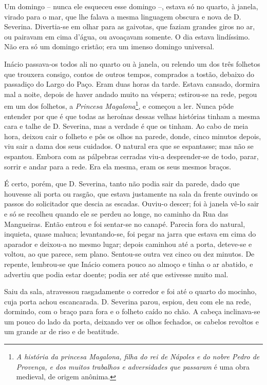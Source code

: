 Um domingo -- nunca ele esqueceu esse domingo --, estava só no quarto, à
janela, virado para o mar, que lhe falava a mesma linguagem obscura e
nova de D. Severina. Divertia-se em olhar para as gaivotas, que faziam
grandes giros no ar, ou pairavam em cima d'água, ou avoaçavam somente. O
dia estava lindíssimo. Não era só um domingo cristão; era um imenso
domingo universal.

Inácio passava-os todos ali no quarto ou à janela, ou relendo um dos
três folhetos que trouxera consigo, contos de outros tempos, comprados a
tostão, debaixo do passadiço do Largo do Paço. Eram duas horas da tarde.
Estava cansado, dormira mal a noite, depois de haver andado muito na
véspera; estirou-se na rede, pegou em um dos folhetos, a \emph{Princesa
Magalona}\footnote{\emph{A história da princesa Magalona, filha do rei
  de Nápoles e do nobre Pedro de Provença, e dos muitos trabalhos e
  adversidades que passaram} é uma obra medieval, de origem anônima.}, e
começou a ler. Nunca pôde entender por que é que todas as heroínas
dessas velhas histórias tinham a mesma cara e talhe de D. Severina, mas
a verdade é que os tinham. Ao cabo de meia hora, deixou cair o folheto e
pôs os olhos na parede, donde, cinco minutos depois, viu sair a dama dos
seus cuidados. O natural era que se espantasse; mas não se espantou.
Embora com as pálpebras cerradas viu-a desprender-se de todo, parar,
sorrir e andar para a rede. Era ela mesma, eram os seus mesmos braços.

É certo, porém, que D. Severina, tanto não podia sair da parede, dado
que houvesse ali porta ou rasgão, que estava justamente na sala da
frente ouvindo os passos do solicitador que descia as escadas. Ouviu-o
descer; foi à janela vê-lo sair e só se recolheu quando ele se perdeu ao
longe, no caminho da Rua das Mangueiras. Então entrou e foi sentar-se no
canapé. Parecia fora do natural, inquieta, quase maluca; levantando-se,
foi pegar na jarra que estava em cima do aparador e deixou-a no mesmo
lugar; depois caminhou até a porta, deteve-se e voltou, ao que parece,
sem plano. Sentou-se outra vez cinco ou dez minutos. De repente,
lembrou-se que Inácio comera pouco ao almoço e tinha o ar abatido, e
advertiu que podia estar doente; podia ser até que estivesse muito mal.

Saiu da sala, atravessou rasgadamente o corredor e foi até o quarto do
mocinho, cuja porta achou escancarada. D. Severina parou, espiou, deu
com ele na rede, dormindo, com o braço para fora e o folheto caído no
chão. A cabeça inclinava-se um pouco do lado da porta, deixando ver os
olhos fechados, os cabelos revoltos e um grande ar de riso e de
beatitude.

